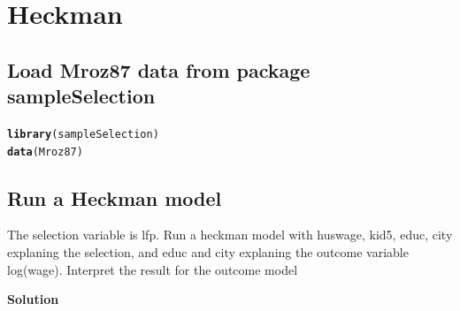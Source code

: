 \documentclass{article}\usepackage[]{graphicx}\usepackage[]{color}
\makeatletter
\newcommand{\hlstd}[1]{\textcolor[rgb]{0.345,0.345,0.345}{#1}}%
\newcommand{\hlkwd}[1]{\textcolor[rgb]{0.737,0.353,0.396}{\textbf{#1}}}%
\newenvironment{kframe}{%
 \def\at@end@of@kframe{}%
 \ifinner\ifhmode%
  \def\at@end@of@kframe{\end{minipage}}%
  \begin{minipage}{\columnwidth}%
 \fi\fi%
 \def\FrameCommand##1{\hskip\@totalleftmargin \hskip-\fboxsep
 \colorbox{shadecolor}{##1}\hskip-\fboxsep
     \hskip-\linewidth \hskip-\@totalleftmargin \hskip\columnwidth}%
 \MakeFramed {\advance\hsize-\width
   \@totalleftmargin\z@ \linewidth\hsize
   \@setminipage}}%
 {\par\unskip\endMakeFramed%
 \at@end@of@kframe}
\newenvironment{knitrout}{}{} %
\makeatother
\begin{document}
\section{Heckman}

\subsection{Load Mroz87 data from package sampleSelection}

\begin{knitrout}
\color{fgcolor}\begin{kframe}
\begin{alltt}
\hlkwd{library}\hlstd{(sampleSelection)}
\hlkwd{data}\hlstd{(Mroz87)}
\end{alltt}
\end{kframe}
\end{knitrout}

\subsection{Run a Heckman model}

The selection variable is lfp. Run a heckman model with huswage, kid5, educ, city explaning the selection, and educ and city explaning the outcome variable log(wage). Interpret the result for the outcome model

\textbf{Solution}
\end{document}
